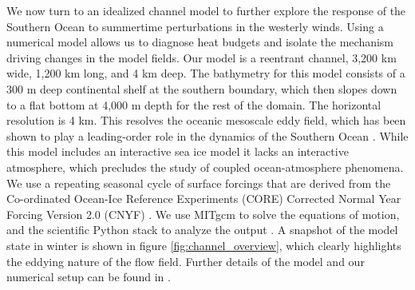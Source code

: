 \documentclass{ametsocV5}
\begin{document}
We now turn to an idealized channel model to further explore the response of the Southern Ocean to summertime perturbations in the westerly winds. Using a numerical model allows us to diagnose heat budgets and isolate the mechanism driving changes in the model fields. Our model is a reentrant channel, 3,200 km wide, 1,200 km long, and 4 km deep. The bathymetry for this model consists of a 300 m deep continental shelf at the southern boundary, which then slopes down to a flat bottom at 4,000 m depth for the rest of the domain. The horizontal resolution is 4 km. This resolves the oceanic mesoscale eddy field, which has been shown to play a leading-order role in the dynamics of the Southern Ocean \citep[see e.g.][]{Marshall2003,Marshall2012b,Munday2013}. While this model includes an interactive sea ice model \citep{Losch2010} it lacks an interactive atmosphere, which precludes the study of coupled ocean-atmosphere phenomena. We use a repeating seasonal cycle of surface forcings that are derived from the Co-ordinated Ocean-Ice Reference Experiments (CORE) Corrected Normal Year Forcing Version 2.0 (CNYF) \citep{Large2004}. We use MITgcm \citep{Marshall1997,Marshall1997b} to solve the equations of motion, and the scientific Python stack to analyze the output \citep{Hoyer2017,Hunter2007,Kluyver2016,Perez2007,VanDerWalt2011}. A snapshot of the model state in winter is shown in figure \ref{fig:channel_overview}, which clearly highlights the eddying nature of the flow field. Further details of the model and our numerical setup can be found in \citet{Doddridge2019a}.
\end{document}
